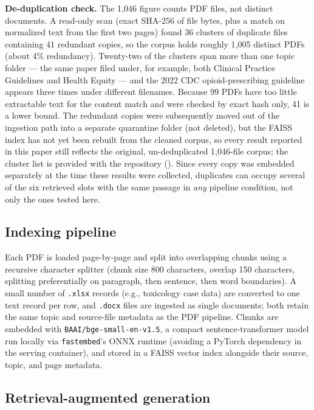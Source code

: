 \documentclass[11pt]{article}
\begin{document}
\textbf{De-duplication check.} The 1{,}046 figure counts PDF files, not distinct documents. A read-only scan (exact SHA-256 of file bytes, plus a match on normalized text from the first two pages) found 36 clusters of duplicate files containing 41 redundant copies, so the corpus holds roughly 1{,}005 distinct PDFs (about 4\% redundancy). Twenty-two of the clusters span more than one topic folder --- the same paper filed under, for example, both Clinical Practice Guidelines and Health Equity --- and the 2022 CDC opioid-prescribing guideline appears three times under different filenames. Because 99 PDFs have too little extractable text for the content match and were checked by exact hash only, 41 is a lower bound. The redundant copies were subsequently moved out of the ingestion path into a separate quarantine folder (not deleted), but the FAISS index has not yet been rebuilt from the cleaned corpus, so every result reported in this paper still reflects the original, un-deduplicated 1{,}046-file corpus; the cluster list is provided with the repository (). Since every copy was embedded separately at the time these results were collected, duplicates can occupy several of the six retrieved slots with the same passage in \emph{any} pipeline condition, not only the ones tested here.

\subsection{Indexing pipeline}

Each PDF is loaded page-by-page and split into overlapping chunks using a recursive character splitter (chunk size 800 characters, overlap 150 characters, splitting preferentially on paragraph, then sentence, then word boundaries). A small number of \texttt{.xlsx} records (e.g., toxicology case data) are converted to one text record per row, and \texttt{.docx} files are ingested as single documents; both retain the same topic and source-file metadata as the PDF pipeline. Chunks are embedded with \texttt{BAAI/bge-small-en-v1.5}, a compact sentence-transformer model run locally via \texttt{fastembed}'s ONNX runtime (avoiding a PyTorch dependency in the serving container), and stored in a FAISS vector index alongside their source, topic, and page metadata.

\subsection{Retrieval-augmented generation}
\end{document}
